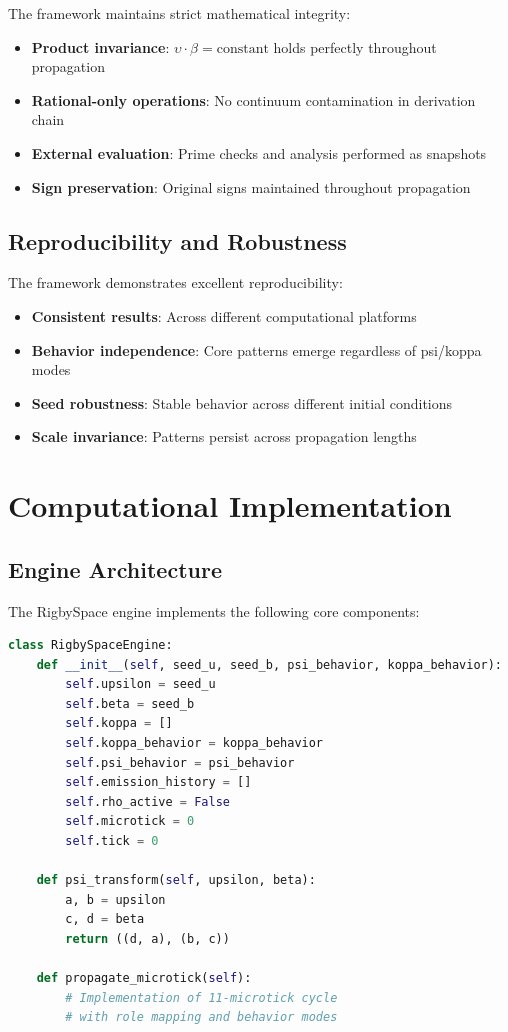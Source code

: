 \documentclass[12pt]{article}
\begin{document}
The framework maintains strict mathematical integrity:

\begin{itemize}
\item \textbf{Product invariance}: $\upsilon \cdot \beta = \text{constant}$ holds perfectly throughout propagation
\item \textbf{Rational-only operations}: No continuum contamination in derivation chain
\item \textbf{External evaluation}: Prime checks and analysis performed as snapshots
\item \textbf{Sign preservation}: Original signs maintained throughout propagation
\end{itemize}

\subsection{Reproducibility and Robustness}

The framework demonstrates excellent reproducibility:

\begin{itemize}
\item \textbf{Consistent results}: Across different computational platforms
\item \textbf{Behavior independence}: Core patterns emerge regardless of psi/koppa modes
\item \textbf{Seed robustness}: Stable behavior across different initial conditions
\item \textbf{Scale invariance}: Patterns persist across propagation lengths
\end{itemize}

\section{Computational Implementation}

\subsection{Engine Architecture}

The RigbySpace engine implements the following core components:

\begin{lstlisting}[language=Python, caption=Core Engine Structure]
class RigbySpaceEngine:
    def __init__(self, seed_u, seed_b, psi_behavior, koppa_behavior):
        self.upsilon = seed_u
        self.beta = seed_b
        self.koppa = []
        self.koppa_behavior = koppa_behavior
        self.psi_behavior = psi_behavior
        self.emission_history = []
        self.rho_active = False
        self.microtick = 0
        self.tick = 0
        
    def psi_transform(self, upsilon, beta):
        a, b = upsilon
        c, d = beta
        return ((d, a), (b, c))
    
    def propagate_microtick(self):
        # Implementation of 11-microtick cycle
        # with role mapping and behavior modes
\end{lstlisting}
\end{document}
